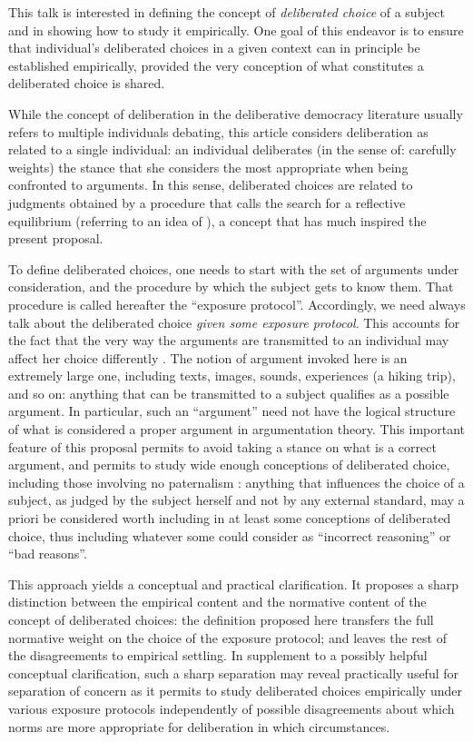 \documentclass[version=last, pagesize, twoside=off, bibliography=totoc, DIV=calc, fontsize=12pt, a4paper, french, english]{scrartcl}
\begin{document}
This talk is interested in defining the concept of \emph{deliberated choice} of a subject and in showing how to study it empirically.
One goal of this endeavor is to ensure that individual’s deliberated choices in a given context can in principle be established empirically, provided the very conception of what constitutes a deliberated choice is shared.

While the concept of deliberation in the deliberative democracy literature usually refers to multiple individuals debating, this article considers deliberation as related to a single individual: an individual deliberates (in the sense of: carefully weights) the stance that she considers the most appropriate when being confronted to arguments. In this sense, deliberated choices are related to judgments obtained by a procedure that \citet{rawls_theory_1999} calls the search for a reflective equilibrium (referring to an idea of \citet{goodman_fact_1983}), a concept that has much inspired the present proposal.

To define deliberated choices, one needs to start with the set of arguments under consideration, and the procedure by which the subject gets to know them. That procedure is called hereafter the “exposure protocol”.
Accordingly, we need always talk about the deliberated choice \emph{given some exposure protocol}. 
This accounts for the fact that the very way the arguments are transmitted to an individual may affect her choice differently \citep{railton_facts_2003}. 
The notion of argument invoked here is an extremely large one, including texts, images, sounds, experiences (a hiking trip), and so on: anything that can be transmitted to a subject qualifies as a possible argument. In particular, such an “argument” need not have the logical structure of what is considered a proper argument in argumentation theory. This important feature of this proposal permits to avoid taking a stance on what is a correct argument, and permits to study wide enough conceptions of deliberated choice, including those involving no paternalism \citep{cailloux_formal_2020}: anything that influences the choice of a subject, as judged by the subject herself and not by any external standard, may a priori be considered worth including in at least some conceptions of deliberated choice, thus including whatever some could consider as “incorrect reasoning” or “bad reasons”.

This approach yields a conceptual and practical clarification. It proposes a sharp distinction between the empirical content and the normative content of the concept of deliberated choices: the definition proposed here transfers the full normative weight on the choice of the exposure protocol; and leaves the rest of the disagreements to empirical settling. 
In supplement to a possibly helpful conceptual clarification, such a sharp separation may reveal practically useful for separation of concern as it permits to study deliberated choices empirically under various exposure protocols independently of possible disagreements about which norms are more appropriate for deliberation in which circumstances.
\end{document}
